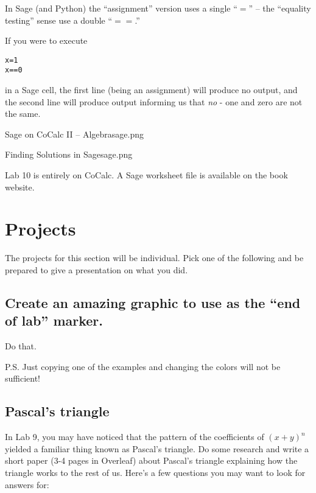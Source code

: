 In Sage (and Python) the ``assignment'' version uses a single ``$=$'' -- the ``equality testing'' sense use a double ``$==$.''  

If you were to execute 

\begin{codeblock}
\begin{verbatim}
x=1
x==0
\end{verbatim}
\end{codeblock}

\noindent in a Sage cell, the first line (being an assignment) will produce no output, and the second line will produce output informing us that {\em no} - one and zero are not the same.


\begin{worksheet}{8}{Sage on CoCalc II -- Algebra}{sage.png}

\end{worksheet}
\clearpage

\begin{worksheet}{9}{Finding Solutions in Sage}{sage.png}

\end{worksheet}
\clearpage

Lab 10 is entirely on CoCalc.  A Sage worksheet file is available on the book website. 

\section{Projects}

The projects for this section will be individual.  Pick one of the following and be prepared to give a presentation on what you did.

\subsection{Create an amazing graphic to use as the ``end of lab'' marker.}

Do that.

P.S. Just copying one of the examples and changing the colors will not be sufficient!

\subsection{Pascal's triangle}

In Lab 9, you may have noticed that the pattern of the coefficients of $(x+y)^n$ yielded a familiar thing known as Pascal's triangle.  Do some research and write a short paper (3-4 pages in Overleaf) about Pascal's triangle explaining how the triangle works to the rest of us.  Here's a few questions you may want to look for answers for:

